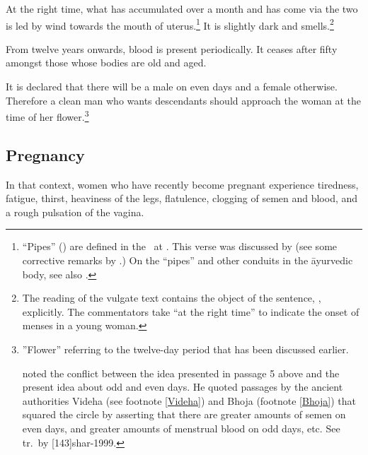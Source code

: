 \begin{translation}


\item[3.3.10]

At the right time, what has accumulated over a month and has come via
the two  is led by wind towards the mouth of
uterus.\footnote{“Pipes” () are defined in the \SS\ at
    . This verse was discussed by
    \citet[64--66]{das-2003} (see some corrective remarks by
    \citet{voge-2005}.) On the “pipes” and other conduits in the āyurvedic
    body, see also \cite[404--406]{wuja-2022}.}  It is slightly dark and
    smells.\footnote{The reading of the vulgate text contains the object
        of the sentence, , explicitly.  The commentators
        take “at the right time” to indicate the onset of menses in a young
        woman.}

\item[3.3.11]

 From twelve years onwards, blood is present periodically. It ceases
after fifty amongst those whose bodies are old and aged.

\item[3.3.12]

It is declared that there will be a male on even days and a female otherwise. 
Therefore a clean man who wants descendants should approach the woman at the 
time of her flower.\footnote{”Flower” referring to the twelve-day period that has 
been discussed earlier.

 noted the conflict between the idea presented in
passage 5 above and the present idea about odd and even days. He
quoted passages by the ancient authorities Videha (see footnote
\ref{Videha}) and Bhoja (footnote \ref{Bhoja}) that squared the
circle by asserting that there are greater amounts of semen on even
days, and greater amounts of menstrual blood on odd days, etc.  See tr.\ by
[143]{shar-1999}.}

\subsection{Pregnancy}
\item [3.3.13]

In that context, women who have recently become pregnant experience 
tiredness,
fatigue,
thirst,
heaviness of the legs,
flatulence,
clogging of semen and blood,
and a rough pulsation of the vagina.

\item [3.3.14ab]


\end{translation}
